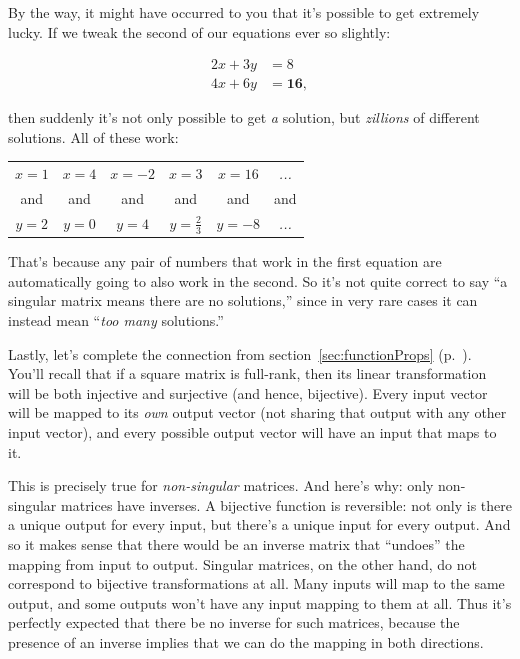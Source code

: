 \medskip

By the way, it might have occurred to you that it's possible to get extremely
lucky. If we tweak the second of our equations ever so slightly:

\vspace{-.25in}
\begin{align*}
2x + 3y &= 8 \\
4x + 6y &= \textbf{16},
\end{align*}
\vspace{-.25in}

then suddenly it's not only possible to get \textit{a} solution, but
\textit{zillions} of different solutions. All of these work:

\begin{center}
\setlength{\tabcolsep}{13pt}
\renewcommand{\arraystretch}{.8}
\begin{tabular}{cccccc}
$x=1$ & $x=4$ & $x=-2$ & $x=3$ & $x=16$ & \textit{...} \\
\scriptsize and &
\scriptsize and &
\scriptsize and &
\scriptsize and &
\scriptsize and &
\scriptsize and\\
$y=2$ & $y=0$ & $y=4$ & $y=\frac{2}{3}$ & $y=-8$ & \textit{...} \\
\end{tabular}
\end{center}

That's because any pair of numbers that work in the first equation are
automatically going to also work in the second. So it's not quite correct to
say ``a singular matrix means there are no solutions,'' since in very rare
cases it can instead mean ``\textit{too many} solutions.''

\medskip
\pagebreak


Lastly, let's complete the connection from section~\ref{sec:functionProps}
(p.~\pageref{sec:functionProps}). You'll recall that if a square matrix is
full-rank, then its linear transformation will be both injective and surjective
(and hence, bijective). Every input vector will be mapped to its \textit{own}
output vector (not sharing that output with any other input vector), and every
possible output vector will have an input that maps to it.


This is precisely true for \textit{non-singular} matrices. And here's why: only
non-singular matrices have inverses. A bijective function is reversible: not
only is there a unique output for every input, but there's a unique input for
every output. And so it makes sense that there would be an inverse matrix that
``undoes'' the mapping from input to output. Singular matrices, on the other
hand, do not correspond to bijective transformations at all. Many inputs will
map to the same output, and some outputs won't have any input mapping to them
at all. Thus it's perfectly expected that there be no inverse for such
matrices, because the presence of an inverse implies that we can do the mapping
in both directions.

